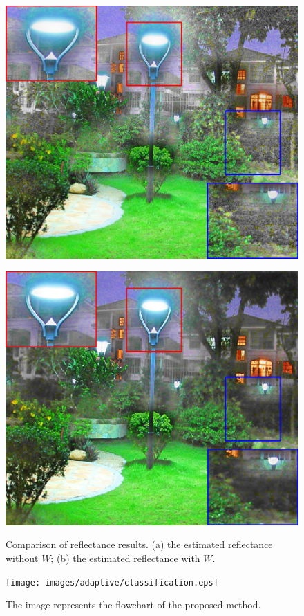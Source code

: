 \begin{figure}[t]
\centering
\begin{minipage}[b]{0.49\hsize}
\centering
\includegraphics[height=0.65\hsize]{images/noise/mlv_wo.eps}
 \label{fig:wo}
\end{minipage}
\begin{minipage}[b]{0.49\hsize}
\centering
\includegraphics[height=0.65\hsize]{images/noise/mlv_reflectance.eps}
 \label{fig:w}
\end{minipage}
\caption{Comparison of reflectance results. (a) the estimated reflectance without $W$; (b) the estimated reflectance with $W$.}
\label{fig: noise_suppression}
\end{figure}

\begin{figure}[htbp]
	\centering
	\texttt{[image: images/adaptive/classification.eps]}
	\caption{The image represents the flowchart of the proposed method.} \label{fig:adaptive/classification}
\end{figure}

